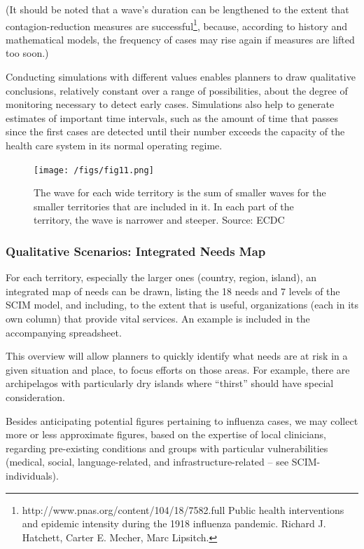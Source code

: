 \documentclass[12pt, a4]{scrartcl}
\begin{document}
(It should be noted that a wave's duration can be lengthened to the extent that contagion-reduction measures are successful\footnote{http://www.pnas.org/content/104/18/7582.full Public health interventions and epidemic intensity during the 1918 influenza pandemic. Richard J. Hatchett, Carter E. Mecher, Marc Lipsitch.}, because, according to history and mathematical models, the frequency of cases may rise again if measures are lifted too soon.)

Conducting simulations with different values enables planners to draw qualitative conclusions, relatively constant over a range of possibilities, about the degree of monitoring necessary to detect early cases. Simulations also help to generate estimates of important time intervals, such as the amount of time that passes since the first cases are detected until their number exceeds the capacity of the health care system in its normal operating regime.

\begin{figure}[h]
\centering
\texttt{[image: /figs/fig11.png]}
\caption{The wave for each wide territory is the sum of smaller waves for the smaller territories that are included in it. In each part of the territory, the wave is narrower and steeper. Source: ECDC}
\end{figure}

\subsubsection{Qualitative Scenarios: Integrated Needs Map}
For each territory, especially the larger ones (country, region, island), an integrated map of needs can be drawn, listing the 18 needs and 7 levels of the SCIM model, and including, to the extent that is useful, organizations (each in its own column) that provide vital services. An example is included in the accompanying spreadsheet.

This overview will allow planners to quickly identify what needs are at risk in a given situation and place, to focus efforts on those areas. For example, there are archipelagos with particularly dry islands where “thirst” should have special consideration.

Besides anticipating potential figures pertaining to influenza cases, we may collect more or less approximate figures, based on the expertise of local clinicians, regarding pre-existing conditions and groups with particular vulnerabilities (medical, social, language-related, and infrastructure-related – see SCIM-individuals).
\end{document}
